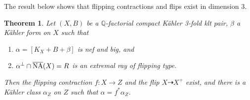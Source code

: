 \documentclass[12pt]{amsart}
\theoremstyle{plain}
\newtheorem{theorem}{Theorem}[section]
\theoremstyle{remark}
\theoremstyle{definition}
\newcommand{\<}{\leq}
\newcommand{\Q}{{\mathbb{Q}}}
\theoremstyle{definition}
\theoremstyle{definition}
\numberwithin{equation}{section}
\theoremstyle{remark}
\begin{document}
The result below shows that flipping contractions and flips exist in dimension $3$. 
\begin{theorem}\label{t-flipcont}  
Let $(X,B)$ be a $\Q$-factorial compact K\"ahler 3-fold klt pair, $\beta$ a K\"ahler form on $X$ such that 
\begin{enumerate}
    \item $\alpha =[K_X+B+\beta]$ is nef and big, and
\item $\alpha ^\perp \cap \overline{\rm NA}(X)=R$ is an extremal ray of flipping type.
\end{enumerate} Then the flipping contraction $f:X\to Z$ and the flip $X\dasharrow X^+$ exist, and there is a K\"ahler class $\alpha _Z$ on $Z$ such that $\alpha=f^*\alpha _Z$.
\end{theorem}
\end{document}
